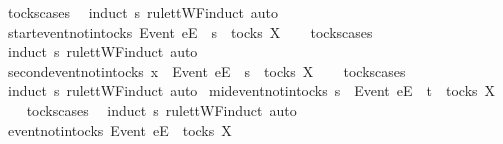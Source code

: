 \begin{isabellebody}
\isatagproof
{}\isamarkupfalse%
\ tocks{\isachardot}cases\ \isamarkupfalse%
\ {\isacharparenleft}induct\ s\ rule{\isacharcolon}ttWF{\isachardot}induct{\isacharcomma}\ auto{\isacharparenright}%
\endisatagproof
{\isafoldproof}%
%
\isadelimproof
\isanewline
%
\endisadelimproof
\isanewline
{}\isamarkupfalse%
\ start{\isacharunderscore}event{\isacharunderscore}notin{\isacharunderscore}tocks{\isacharcolon}\ {\isachardoublequoteopen}{\isacharbrackleft}Event\ e{\isacharbrackright}\isactrlsub E\ {\isacharhash}\ s\ {\isasymnotin}\ tocks\ X{\isachardoublequoteclose}\isanewline
%
\isadelimproof
\ \ %
\endisadelimproof
%
\isatagproof
{}\isamarkupfalse%
\ tocks{\isachardot}cases\ \isamarkupfalse%
\ {\isacharparenleft}induct\ s\ rule{\isacharcolon}ttWF{\isachardot}induct{\isacharcomma}\ auto{\isacharparenright}%
\endisatagproof
{\isafoldproof}%
%
\isadelimproof
\isanewline
%
\endisadelimproof
\isanewline
{}\isamarkupfalse%
\ second{\isacharunderscore}event{\isacharunderscore}notin{\isacharunderscore}tocks{\isacharcolon}\ {\isachardoublequoteopen}x\ {\isacharhash}\ {\isacharbrackleft}Event\ e{\isacharbrackright}\isactrlsub E\ {\isacharhash}\ s\ {\isasymnotin}\ tocks\ X{\isachardoublequoteclose}\isanewline
%
\isadelimproof
\ \ %
\endisadelimproof
%
\isatagproof
{}\isamarkupfalse%
\ tocks{\isachardot}cases\ \isamarkupfalse%
\ {\isacharparenleft}induct\ s\ rule{\isacharcolon}ttWF{\isachardot}induct{\isacharcomma}\ auto{\isacharparenright}%
\endisatagproof
{\isafoldproof}%
%
\isadelimproof
\isanewline
%
\endisadelimproof
\isanewline
{}\isamarkupfalse%
\ mid{\isacharunderscore}event{\isacharunderscore}notin{\isacharunderscore}tocks{\isacharcolon}\ {\isachardoublequoteopen}s\ {\isacharat}\ {\isacharbrackleft}{\isacharbrackleft}Event\ e{\isacharbrackright}\isactrlsub E{\isacharbrackright}\ {\isacharat}\ t\ {\isasymnotin}\ tocks\ X{\isachardoublequoteclose}\isanewline
%
\isadelimproof
\ \ %
\endisadelimproof
%
\isatagproof
{}\isamarkupfalse%
\ tocks{\isachardot}cases\ \isamarkupfalse%
\ {\isacharparenleft}induct\ s\ rule{\isacharcolon}ttWF{\isachardot}induct{\isacharcomma}\ auto{\isacharparenright}%
\endisatagproof
{\isafoldproof}%
%
\isadelimproof
\isanewline
%
\endisadelimproof
\isanewline
{}\isamarkupfalse%
\ event{\isacharunderscore}notin{\isacharunderscore}tocks{\isacharcolon}\ {\isachardoublequoteopen}{\isacharbrackleft}{\isacharbrackleft}Event\ e{\isacharbrackright}\isactrlsub E{\isacharbrackright}\ {\isasymnotin}\ tocks\ X{\isachardoublequoteclose}\isanewline

\end{isabellebody}
